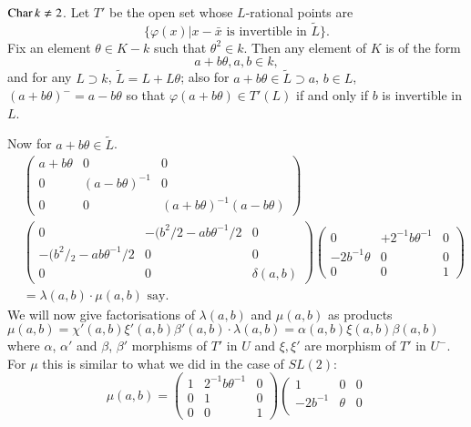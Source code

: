 \begin{case}%
$\operatorname{Char} k \neq 2$. Let $T'$ be the open set whose $L$-rational points are 
$$
\{\varphi (x)| x - \bar{x} \text{ is invertible in  } \tilde{L} \}.
$$
Fix an element $\theta \in K - k$ such that $\theta^2 \in k$. Then any element of $K$ is of the form 
$$
a + b \theta, a, b \in k,
$$
and for any $L \supset k$, $\tilde{L} = L + L \theta$; also for $a+ b \theta \in \tilde{L} \supset a$, $b \in L$, $(a + b \theta)^- = a - b \theta$ so that $\varphi (a + b \theta) \in T'(L)$ if and only if $b$ is invertible in $L$.

Now for $a + b \theta \in \tilde{L}$.
{\fontsize{10pt}{12pt}\selectfont
\begin{align*}
& \left(\begin{matrix}
a+ b\theta & 0 & 0\\
0 & (a-b\theta)^{-1} & 0\\
0 & 0 & (a+b \theta)^{-1} (a-b\theta)
\end{matrix}\right)\\
& \left(\begin{matrix}
0 & -(b^2 / 2 - a b \theta^{-1}/ 2 & 0\\
-(b^2 /{}_2 - ab \theta^{-1}/2 & 0 & 0 \\
0 & 0 & \delta (a,b)
\end{matrix}\right)  
\left(\begin{matrix}
0 & +2^{-1} b \theta^{-1} & 0\\
-2b^{-1} \theta & 0 & 0 \\
0 & 0 & 1
\end{matrix}\right)\\
& = \lambda (a, b) \cdot \mu (a, b) \text{ say.}
\end{align*}}
We will now give factorisations of $\lambda (a,b)$ and $\mu(a,b)$ as products\break $\mu(a,b) = \chi'(a, b) \xi'(a,b) \beta'(a,b) \cdot \lambda (a, b) = \alpha (a,b) \xi (a,b) \beta (a,b)$ where $\alpha$, $\alpha'$ and $\beta$, $\beta'$ morphisms of $T'$ in $U$ and $\xi, \xi'$ are morphism of $T'$ in $U^-$. For $\mu$ this is similar to what we did in the case of $SL(2)$:
$$
\mu(a,b) = \left(\begin{matrix}
1 & 2^{-1} b \theta^{-1} & 0\\
0 & 1 & 0\\
0 & 0 & 1
\end{matrix}\right) 
\left(\begin{matrix}
1 & 0 & 0\\
-2b^{-1} &  \theta  & 0\\

\end{matrix}$$
\end{case}
